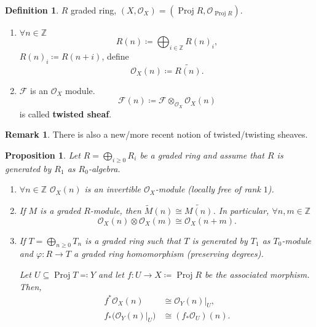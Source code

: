 \documentclass[12pt]{article}
\DeclareMathOperator{\Proj}{Proj}
\newtheorem*{proposition}{Proposition}
\theoremstyle{definition}
\newtheorem*{definition}{Definition}
\newtheorem*{remark}{Remark}
\begin{document}
\begin{definition}
$R$ graded ring, $(X,\mathcal O_X)=(\Proj R,\mathcal O_{\Proj R})$.

\begin{enumerate}[label=\arabic*)]
\item $\forall n\in\mathbb Z$
\[R(n)\coloneqq\bigoplus_{i\in\mathbb Z}R(n)_i,\]
$R(n)_i\coloneqq R(n+i)$, define
\[\mathcal O_X(n)\coloneqq\widetilde{R(n)}.\]

\item $\mathcal F$ is an $\mathcal O_X$ module.
\[\mathcal F(n)\coloneqq\mathcal F\otimes_{\mathcal O_X}\mathcal O_X(n)\]
is called \textbf{twisted sheaf}.
\end{enumerate}
\end{definition}

\begin{remark}
There is also a new/more recent notion of twisted/twisting sheaves.
\end{remark}

\begin{proposition}
Let $R=\bigoplus_{i\geq0}R_i$ be a graded ring and assume that $R$ is generated by $R_1$ as $R_0$-algebra.

\begin{enumerate}[label=\arabic*)]
\item $\forall n\in\mathbb Z$ $\mathcal O_X(n)$ is an invertible $\mathcal O_X$-module (locally free of rank $1$).

\item If $M$ is a graded $R$-module, then $\widetilde M(n)\cong\widetilde{M(n)}$. In particular, $\forall n,m\in\mathbb Z$
\[\mathcal O_X(n)\otimes\mathcal O_X(m)\cong\mathcal O_X(n+m).\]

\item If $T=\bigoplus_{n\geq0}T_n$ is a graded ring such that $T$ is generated by $T_1$ as $T_0$-module and $\varphi:R\rightarrow T$ a graded ring homomorphism (preserving degrees).

Let $U\subseteq\Proj T\eqqcolon Y$ and let $f:U\rightarrow X\coloneqq\Proj R$ be the associated morphism. Then,
\begin{align*}
f^*\mathcal O_X(n)&\cong\mathcal O_Y(n)|_U,\\f_*\big(\mathcal O_Y(n)|_U\big)&\cong(f_*\mathcal O_U)(n).
\end{align*}
\end{enumerate}
\end{proposition}
\end{document}
